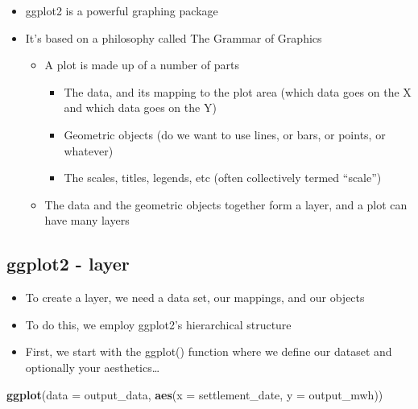 \documentclass[]{article}
\newenvironment{Shaded}{\begin{snugshade}}{\end{snugshade}}
\newcommand{\KeywordTok}[1]{\textcolor[rgb]{0.13,0.29,0.53}{\textbf{#1}}}
\newcommand{\DataTypeTok}[1]{\textcolor[rgb]{0.13,0.29,0.53}{#1}}
\newcommand{\NormalTok}[1]{#1}
\providecommand{\tightlist}{%
  \setlength{\itemsep}{0pt}\setlength{\parskip}{0pt}}
\begin{document}
\begin{itemize}
\tightlist
\item
  ggplot2 is a powerful graphing package
\item
  It's based on a philosophy called The Grammar of Graphics

  \begin{itemize}
  \tightlist
  \item
    A plot is made up of a number of parts

    \begin{itemize}
    \tightlist
    \item
      The data, and its mapping to the plot area (which data goes on the
      X and which data goes on the Y)
    \item
      Geometric objects (do we want to use lines, or bars, or points, or
      whatever)
    \item
      The scales, titles, legends, etc (often collectively termed
      ``scale'')
    \end{itemize}
  \item
    The data and the geometric objects together form a layer, and a plot
    can have many layers
  \end{itemize}
\end{itemize}

\subsection{ggplot2 - layer}\label{ggplot2---layer}

\begin{itemize}
\tightlist
\item
  To create a layer, we need a data set, our mappings, and our objects
\item
  To do this, we employ ggplot2's hierarchical structure
\item
  First, we start with the ggplot() function where we define our dataset
  and optionally your aesthetics\ldots{}
\end{itemize}

\begin{Shaded}
\begin{Highlighting}[]
\KeywordTok{ggplot}\NormalTok{(}\DataTypeTok{data =}\NormalTok{ output_data, }\KeywordTok{aes}\NormalTok{(}\DataTypeTok{x =}\NormalTok{ settlement_date, }\DataTypeTok{y =}\NormalTok{ output_mwh))}
\end{Highlighting}
\end{Shaded}
\end{document}
